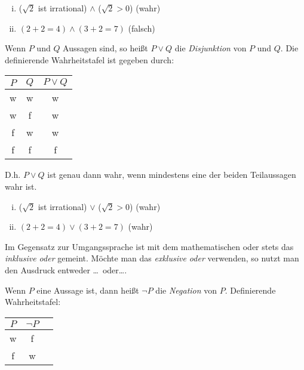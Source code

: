 \begin{example}
    \begin{enumerate}[(i)]
        \item
        ($\sqrt{2}$ ist irrational) $\wedge$ ($\sqrt{2} > 0$) (wahr)
        \item
        $(2 + 2 = 4) \wedge (3 + 2 = 7)$ (falsch)
    \end{enumerate}
\end{example}

\begin{mydef}
    Wenn $P$ und $Q$ Aussagen sind, so heißt $P \vee Q$ die \textit{Disjunktion} von $P$ und $Q$.
    Die definierende Wahrheitstafel ist gegeben durch: \newline
    \begin{tabular}{ c | c | c }
        $P$ & $Q$ & $P \vee Q$ \\
        \hline
        w & w & w \\
        w & f & w \\
        f & w & w \\
        f & f & f \\
    \end{tabular}
    \newline 
    D.h. $P \vee Q$ ist genau dann wahr, wenn mindestens eine der beiden Teilaussagen wahr ist.
\end{mydef}

\begin{example}
    \begin{enumerate}[(i)]
        \item
        ($\sqrt{2}$ ist irrational) $\vee$ ($\sqrt{2} > 0$) (wahr)
        \item
        $(2 + 2 = 4) \vee (3 + 2 = 7)$ (wahr)
    \end{enumerate}
\end{example}

\begin{remark}
    Im Gegensatz zur Umgangssprache ist mit dem mathematischen oder stets das \textit{inklusive oder} gemeint.
    Möchte man das \textit{exklusive oder} verwenden, so nutzt man den Ausdruck \glqq entweder \ldots\ oder\ldots\grqq.
\end{remark}

\begin{mydef}
    Wenn $P$ eine Aussage ist, dann heißt $\neg P$ die \textit{Negation} von $P$.
    Definierende Wahrheitstafel: \newline
    \begin{tabular}{ c | c | c }
        $P$ &  $\neg P$ \\
        \hline
        w & f  \\
        f & w  \\
    \end{tabular}
\end{mydef}

